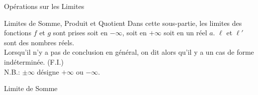 \documentclass{coursbook}
\begin{document}
    \begin{Gpartie}{Opérations sur les Limites} 
        \begin{Spartie}{Limites de Somme, Produit et Quotient} 
            Dans cette sous-partie, les limites des fonctions $f$ et $g$ sont prises soit en $-\infty$, soit en $+\infty$ soit en un réel $a$. $\ell$ et $\ell'$ sont des nombres réels. \\ Lorsqu'il n'y a pas de conclusion en général, on dit alors qu'il y a un cas de forme indéterminée. (F.I.) \\
            N.B.: $\pm\infty$ désigne $+\infty$ ou $-\infty$.
            \begin{SSpartie}{Limite de Somme} 
                \begin{table}[H]
                    \centering {}
\end{table}
\end{SSpartie}
\end{Spartie}
\end{Gpartie}
\end{document}
